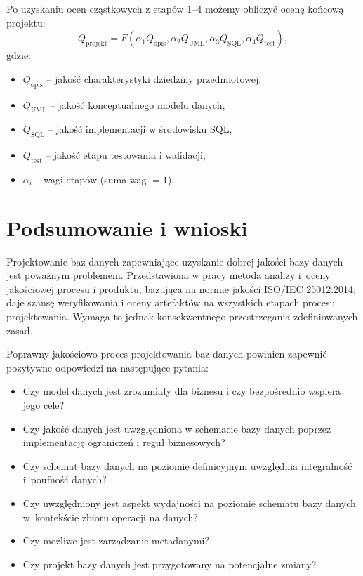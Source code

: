 Po uzyskaniu ocen cząstkowych z etapów 1--4 możemy obliczyć ocenę końcową projektu:
\begin{equation}
  Q_{\mathrm{projekt}} = F(\alpha_1 Q_{\mathrm{opis}}, \alpha_2 Q_{\mathrm{UML}}, \alpha_3 Q_{\mathrm{SQL}}, \alpha_4 Q_{\mathrm{test}}),
\end{equation}
gdzie:
\begin{itemize}
  \item $Q_{\mathrm{opis}}$ -- jakość charakterystyki dziedziny przedmiotowej,
  \item $Q_{\mathrm{UML}}$ -- jakość konceptualnego modelu danych,
  \item $Q_{\mathrm{SQL}}$ -- jakość implementacji w środowisku SQL,
  \item $Q_{\mathrm{test}}$ -- jakość etapu testowania i walidacji,
  \item $\alpha_i$ -- wagi etapów (suma wag $=1$).
\end{itemize}

\section{Podsumowanie i wnioski}

Projektowanie baz danych zapewniające uzyskanie dobrej jakości bazy danych jest poważnym problemem. Przedstawiona w pracy metoda analizy i~oceny jakościowej procesu i produktu, bazująca na normie jakości ISO/IEC 25012:2014, daje szansę weryfikowania i oceny artefaktów na wszystkich etapach procesu projektowania. Wymaga to jednak konsekwentnego przestrzegania zdefiniowanych zasad.

Poprawny jakościowo proces projektowania baz danych powinien zapewnić pozytywne odpowiedzi na następujące pytania:
\begin{itemize}
  \item Czy model danych jest zrozumiały dla biznesu i czy bezpośrednio wspiera jego cele?
  \item Czy jakość danych jest uwzględniona w schemacie bazy danych poprzez implementację ograniczeń i reguł biznesowych?
  \item Czy schemat bazy danych na poziomie definicyjnym uwzględnia integralność i~poufność danych?
  \item Czy uwzględniony jest aspekt wydajności na poziomie schematu bazy danych w~kontekście zbioru operacji na danych?
  \item Czy możliwe jest zarządzanie metadanymi?
  \item Czy projekt bazy danych jest przygotowany na potencjalne zmiany?
\end{itemize}


